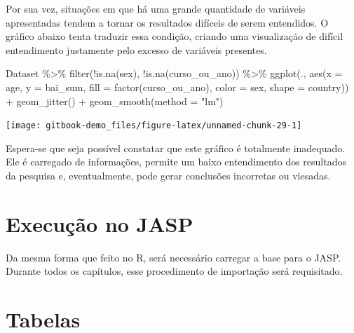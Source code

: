 \documentclass[
]{book}
\newenvironment{Shaded}{\begin{snugshade}}{\end{snugshade}}
\newcommand{\AttributeTok}[1]{\textcolor[rgb]{0.77,0.63,0.00}{#1}}
\newcommand{\FunctionTok}[1]{\textcolor[rgb]{0.00,0.00,0.00}{#1}}
\newcommand{\NormalTok}[1]{#1}
\newcommand{\SpecialCharTok}[1]{\textcolor[rgb]{0.00,0.00,0.00}{#1}}
\newcommand{\StringTok}[1]{\textcolor[rgb]{0.31,0.60,0.02}{#1}}
\begin{document}
Por sua vez, situações em que há uma grande quantidade de variáveis apresentadas tendem a tornar os resultados difíceis de serem entendidos. O gráfico abaixo tenta traduzir essa condição, criando uma visualização de difícil entendimento justamente pelo excesso de variáveis presentes.

\begin{Shaded}
\begin{Highlighting}[]
\NormalTok{Dataset }\SpecialCharTok{\%\textgreater{}\%} 
  \FunctionTok{filter}\NormalTok{(}\SpecialCharTok{!}\FunctionTok{is.na}\NormalTok{(sex), }\SpecialCharTok{!}\FunctionTok{is.na}\NormalTok{(curso\_ou\_ano)) }\SpecialCharTok{\%\textgreater{}\%} 
  \FunctionTok{ggplot}\NormalTok{(., }\FunctionTok{aes}\NormalTok{(}\AttributeTok{x =}\NormalTok{ age, }\AttributeTok{y =}\NormalTok{ bai\_sum, }
                \AttributeTok{fill =} \FunctionTok{factor}\NormalTok{(curso\_ou\_ano), }
                \AttributeTok{color =}\NormalTok{ sex, }\AttributeTok{shape =}\NormalTok{ country)) }\SpecialCharTok{+}
  \FunctionTok{geom\_jitter}\NormalTok{() }\SpecialCharTok{+}
  \FunctionTok{geom\_smooth}\NormalTok{(}\AttributeTok{method =} \StringTok{"lm"}\NormalTok{) }
\end{Highlighting}
\end{Shaded}

\begin{center}\texttt{[image: gitbook-demo\_files/figure-latex/unnamed-chunk-29-1]} \end{center}

Espera-se que seja possível constatar que este gráfico é totalmente inadequado. Ele é carregado de informações, permite um baixo entendimento dos resultados da pesquisa e, eventualmente, pode gerar conclusões incorretas ou viesadas.

\hypertarget{execuuxe7uxe3o-no-jasp}{%
\section{Execução no JASP}\label{execuuxe7uxe3o-no-jasp}}

Da mesma forma que feito no R, será necessário carregar a base para o JASP. Durante todos os capítulos, esse procedimento de importação será requisitado.

\hypertarget{tabelas-1}{%
\section{Tabelas}\label{tabelas-1}}
\end{document}
